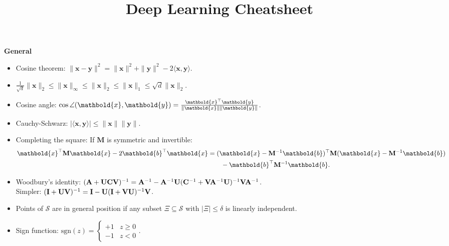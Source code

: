 \documentclass[10pt]{article}
\title{Deep Learning Cheatsheet}
\newenvironment{subtopic}[1]
{\vspace{0.1cm} \begin{center}\textbf{\footnotesize \sffamily #1}\end{center}}
{}
\renewcommand{\mat}[1]{\ensuremath{\mathbf{#1}}}
\renewcommand{\vec}[1]{\ensuremath{\mathbold{#1}}}
\begin{document}
\setlength{\columnsep}{0.25cm}

\begin{multicols*}{3}

    \scriptsize

    \begin{subtopic}{General}
        \begin{itemize}[left=0pt]
            \item Cosine theorem: $\| \vec{x}-\vec{y} \|^2 = \| \vec{x} \|^2 + \| \vec{y} \|^2 - 2\langle \vec{x},\vec{y} \rangle$.
            \item $\frac{1}{\sqrt{d}} \| \vec{x} \|_2 \leq \| \vec{x} \|_{\infty} \leq \| \vec{x} \|_2 \leq \| \vec{x} \|_1 \leq \sqrt{d} \| \vec{x} \|_2$.
            \item Cosine angle: $\cos \angle{(\vec{x},\vec{y})} = \frac{\transpose{\vec{x}} \vec{y}}{\| \vec{x} \| \|
                        \vec{y} \|}$.
            \item Cauchy-Schwarz: $|\langle \vec{x}, \vec{y} \rangle| \leq \| \vec{x} \| \| \vec{y} \|$.
            \item Completing the square: If $\mat{M}$ is symmetric and invertible:
                \begin{align*}
                    \transpose{\vec{x}} \mat{M} \vec{x} - 2 \transpose{\vec{b}} \vec{x} & = \transpose{(\vec{x} - \inv{\mat{M}} \vec{b})} \mat{M} (\vec{x} - \inv{\mat{M}} \vec{b}) \\
                                                                                        & \quad \quad - \transpose{\vec{b}} \inv{\mat{M}} \vec{b}.
                \end{align*}
            \item Woodbury's identity: $\inv{(\mat{A} + \mat{U} \mat{C} \mat{V})} = \inv{\mat{A}} - \inv{\mat{A}} \mat{U} \inv{(\inv{\mat{C}} + \mat{V} \inv{\mat{A}} \mat{U})} \mat{V} \inv{\mat{A}}$. \\
                Simpler: $\inv{(\mat{I} + \mat{U} \mat{V})} = \mat{I} - \mat{U} \inv{(\mat{I} + \mat{V} \mat{U})} \mat{V}$.
            \item Points of $\mathcal{S}$ are in general position if any subset $\Xi \subseteq \mathcal{S}$ with
                $|\Xi| \leq \delta$ is linearly independent.
            \item Sign function: $\mathrm{sgn}(z) = \begin{cases} +1 & z \geq 0 \\ -1 & z < 0 \end{cases}$.

\end{itemize}
\end{subtopic}
\end{multicols*}
\end{document}
